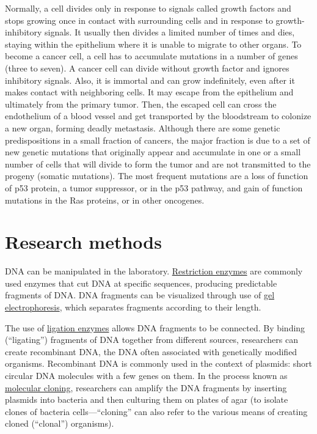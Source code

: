 Normally, a cell divides only in response to signals called growth factors and stops growing once in contact with surrounding cells and in response to growth-inhibitory signals. It usually then divides a limited number of times and dies, staying within the epithelium where it is unable to migrate to other organs. To become a cancer cell, a cell has to accumulate mutations in a number of genes (three to seven). A cancer cell can divide without growth factor and ignores inhibitory signals. Also, it is immortal and can grow indefinitely, even after it makes contact with neighboring cells. It may escape from the epithelium and ultimately from the primary tumor. Then, the escaped cell can cross the endothelium of a blood vessel and get transported by the bloodstream to colonize a new organ, forming deadly metastasis. Although there are some genetic predispositions in a small fraction of cancers, the major fraction is due to a set of new genetic mutations that originally appear and accumulate in one or a small number of cells that will divide to form the tumor and are not transmitted to the progeny (somatic mutations). The most frequent mutations are a loss of function of p53 protein, a tumor suppressor, or in the p53 pathway, and gain of function mutations in the Ras proteins, or in other oncogenes.

\hypertarget{research-methods}{%
\section{Research methods}\label{research-methods}}

DNA can be manipulated in the laboratory. \href{https://en.wikipedia.org/wiki/Restriction_enzyme}{Restriction enzymes} are commonly used enzymes that cut DNA at specific sequences, producing predictable fragments of DNA. DNA fragments can be visualized through use of \href{https://en.wikipedia.org/wiki/Gel_electrophoresis}{gel electrophoresis}, which separates fragments according to their length.

The use of \href{https://en.wikipedia.org/wiki/Ligation_(molecular_biology)}{ligation enzymes} allows DNA fragments to be connected. By binding (``ligating'') fragments of DNA together from different sources, researchers can create recombinant DNA, the DNA often associated with genetically modified organisms. Recombinant DNA is commonly used in the context of plasmids: short circular DNA molecules with a few genes on them. In the process known as \href{https://en.wikipedia.org/wiki/Molecular_cloning}{molecular cloning}, researchers can amplify the DNA fragments by inserting plasmids into bacteria and then culturing them on plates of agar (to isolate clones of bacteria cells---``cloning'' can also refer to the various means of creating cloned (``clonal'') organisms).

